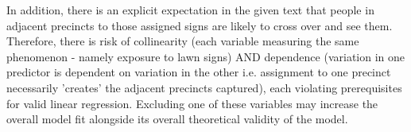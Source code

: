 \documentclass[12pt,letterpaper]{article}
\begin{document}
\begin{enumerate}
	\noindent In addition, there is an explicit expectation in the given text that people in adjacent precincts to those assigned signs are likely to cross over and see them. Therefore, there is risk of collinearity (each variable measuring the same phenomenon - namely exposure to lawn signs) AND dependence (variation in one predictor is dependent on variation in the other i.e. assignment to one precinct necessarily 'creates' the adjacent precincts captured), each violating prerequisites for valid linear regression. Excluding one of these variables may increase the overall model fit alongside its overall theoretical validity of the model.
	
\end{enumerate}  
\end{document}

